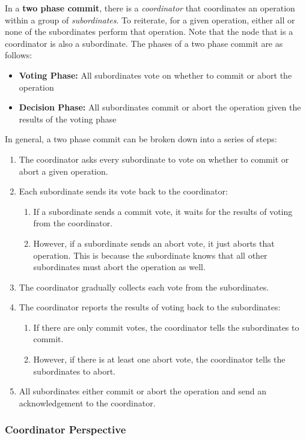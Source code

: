 \documentclass[twoside]{article}
\begin{document}
In a \textbf{two phase commit}, there is a \emph{coordinator} that coordinates an operation within a group of \emph{subordinates}. To reiterate, for a given operation, either all or none of the subordinates perform that operation. Note that the node that is a coordinator is also a subordinate. The phases of a two phase commit are as follows:
\begin{itemize}
    \item \textbf{Voting Phase:} All subordinates vote on whether to commit or abort the operation
    \item \textbf{Decision Phase:} All subordinates commit or abort the operation given the results of the voting phase
\end{itemize}
In general, a two phase commit can be broken down into a series of steps:
\begin{enumerate}
    \item The coordinator asks every subordinate to vote on whether to commit or abort a given operation.
    \item Each subordinate sends its vote back to the coordinator:
        \begin{enumerate}
            \item If a subordinate sends a commit vote, it waits for the results of voting from the coordinator.
            \item However, if a subordinate sends an abort vote, it just aborts that operation. This is because the subordinate knows that all other subordinates must abort the operation as well.
        \end{enumerate}
    \item The coordinator gradually collects each vote from the subordinates.
    \item The coordinator reports the results of voting back to the subordinates:
        \begin{enumerate}
            \item If there are only commit votes, the coordinator tells the subordinates to commit. 
            \item However, if there is at least one abort vote, the coordinator tells the subordinates to abort. 
        \end{enumerate} 
    \item All subordinates either commit or abort the operation and send an acknowledgement to the coordinator.
\end{enumerate}

\subsubsection{Coordinator Perspective}
\end{document}
